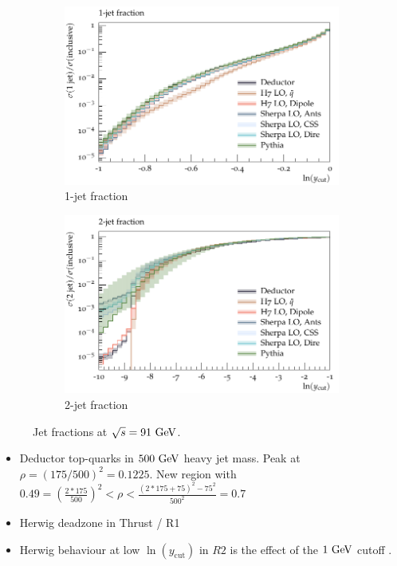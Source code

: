 \begin{figure}[h]
  \centering
  \begin{subfigure}[t]{0.49\textwidth}
    \includegraphics[width=1\textwidth]{plots/EE-91-MuShower/MC_EETOJETS/R1.pdf}
    \caption{1-jet fraction}
  \end{subfigure}
  \begin{subfigure}[t]{0.49\textwidth}
    \includegraphics[width=1\textwidth]{plots/EE-91-MuShower/MC_EETOJETS/R2.pdf}
    \caption{2-jet fraction}
  \end{subfigure}
  \caption{Jet fractions at $\sqrt{s}=91~\textrm{GeV}$.}
\end{figure}

\begin{itemize}
  \item Deductor top-quarks in $500~\textrm{GeV}$ heavy jet mass. Peak at $\rho = (175/500)^2=0.1225$. New region with $0.49=(\frac{2*175}{500})^2 < \rho < \frac{(2*175 + 75)^2 - 75^2}{500^2}=0.7$
  \item Herwig deadzone in Thrust / R1
  \item Herwig behaviour at low $\ln(y_\textrm{cut})$ in $R2$ is the effect of the $1~\textrm{GeV}$ cutoff .
\end{itemize}

